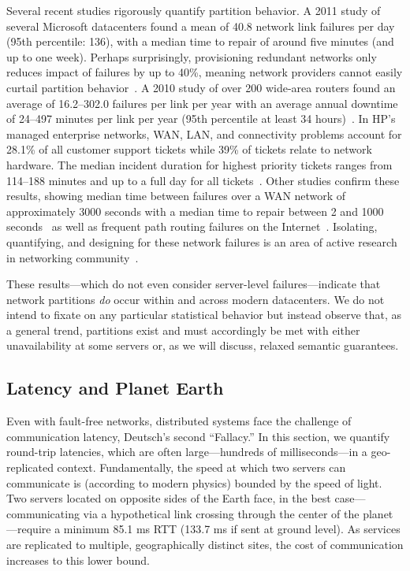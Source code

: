 Several recent studies rigorously quantify partition behavior. A 2011
study of several Microsoft datacenters found a mean of 40.8 network
link failures per day (95th percentile: 136), with a median time to
repair of around five minutes (and up to one week). Perhaps
surprisingly, provisioning redundant networks only reduces impact of
failures by up to 40\%, meaning network providers cannot easily
curtail partition behavior~\cite{sigcomm-dc}. A 2010 study of over 200
wide-area routers found an average of 16.2--302.0 failures per link
per year with an average annual downtime of 24--497 minutes per link
per year (95th percentile at least 34 hours)~\cite{sigcomm-wan}. In
HP's managed enterprise networks, WAN, LAN, and connectivity problems
account for 28.1\% of all customer support tickets while 39\% of
tickets relate to network hardware.  The median incident duration for
highest priority tickets ranges from 114--188 minutes and up to a full
day for all tickets~\cite{turner2012failure}. Other studies confirm
these results, showing median time between failures over a WAN network
of approximately 3000 seconds with a median time to repair between 2
and 1000 seconds~\cite{ip-backbone-failures} as well as frequent path
routing failures on the Internet~\cite{labovitz-failures}. Isolating,
quantifying, and designing for these network failures is an area of
active research in networking
community~\cite{uw-failure-networks}.

These results---which do not even consider server-level
failures---indicate that network partitions \textit{do} occur within
and across modern datacenters. We do not intend to fixate on any
particular statistical behavior but instead observe that, as a general
trend, partitions exist and must accordingly be met with either
unavailability at some servers or, as we will discuss, relaxed
semantic guarantees.

\subsection{Latency and Planet Earth}
\label{sec:latency}

Even with fault-free networks, distributed systems face the challenge
of communication latency, Deutsch's second ``Fallacy.'' In this
section, we quantify round-trip latencies, which are often
large---hundreds of milliseconds---in a geo-replicated context.
Fundamentally, the speed at which two servers can communicate is
(according to modern physics) bounded by the speed of light. Two
servers located on opposite sides of the Earth face, in the best
case---communicating via a hypothetical link crossing through the
center of the planet---require a minimum 85.1 ms RTT (133.7 ms if sent
at ground level). As services are replicated to multiple,
geographically distinct sites, the cost of communication increases to
this lower bound.


